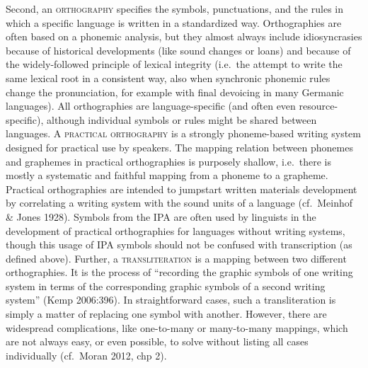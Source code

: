 {{{{{{{{{Second, an \textsc{orthography} specifies the symbols, punctuations, and the rules in which a specific language is written in a standardized way. Orthographies are often based on a phonemic analysis, but they almost always include idiosyncrasies because of historical developments (like sound changes or loans) and because of the widely-followed principle of lexical integrity (i.e.~the attempt to write the same lexical root in a consistent way, also when synchronic phonemic rules change the pronunciation, for example with final devoicing in many Germanic languages). All orthographies are language-specific (and often even resource-specific), although individual symbols or rules might be shared between languages. A \textsc{practical orthography} is a strongly phoneme-based writing system designed for practical use by speakers. The mapping relation between phonemes and graphemes in practical orthographies is purposely shallow, i.e.~there is mostly a systematic and faithful mapping from a phoneme to a grapheme. Practical orthographies are intended to jumpstart written materials development by correlating a writing system with the sound units of a language (cf.~Meinhof \& Jones 1928). Symbols from the IPA are often used by linguists in the development of practical orthographies for languages without writing systems, though this usage of IPA symbols should not be confused with transcription (as defined above). Further, a \textsc{transliteration} is a mapping between two different orthographies. It is the process of ``recording the graphic symbols of one writing system in terms of the corresponding graphic symbols of a second writing system'' (Kemp 2006:396). In straightforward cases, such a transliteration is simply a matter of replacing one symbol with another. However, there are widespread complications, like one-to-many or many-to-many mappings, which are not always easy, or even possible, to solve without listing all cases individually (cf.~Moran 2012, chp 2).

}}}}}}}}}
